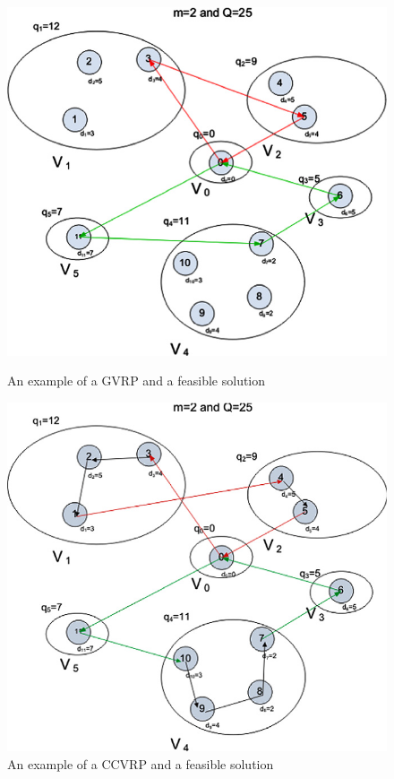 \documentclass[letterpaper,12pt,onehalfspacing,twoside]{article}
\theoremstyle{msds}
\begin{document}
\begin{figure}[!tbp]
  \centering
  \begin{minipage}[b]{0.49\textwidth}
\includegraphics[width=\textwidth]{example_gvrp.png}
\caption{An example of a GVRP and a feasible solution \citep{POP201297}}
\label{fig:example_gvrp}
  \end{minipage}
  \hfill
  \begin{minipage}[b]{0.49\textwidth}
\includegraphics[width=\textwidth]{example_ccvrp.png}
\caption{An example of a CCVRP and a feasible solution \citep{POP201297}}
\label{fig:example_ccvrp}
  \end{minipage}
\end{figure}
\end{document}
